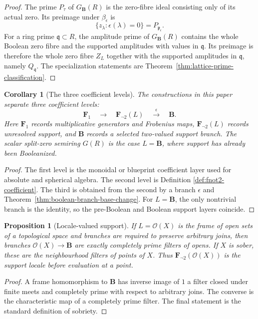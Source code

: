 \documentclass[11pt]{amsart}
\numberwithin{equation}{section}
\newtheorem{proposition}[theorem]{Proposition}
\newtheorem{corollary}[theorem]{Corollary}
\theoremstyle{definition}
\newcommand{\B}{\mathbf B}
\newcommand{\Fone}{\mathbf F_1}
\newcommand{\Fnot}{\mathbf F_{\neg 2}}
\begin{document}
\begin{proof}
The prime $P_\tau$ of $G_\B(R)$ is the zero-fibre ideal consisting only of
its actual zero.  Its preimage under $\beta_\epsilon$ is
\[
\{z_\lambda:\epsilon(\lambda)=0\}=P_{\mathfrak p_\epsilon}.
\]
For a ring prime $\mathfrak q\subset R$, the amplitude prime of
$G_\B(R)$ contains the whole Boolean zero fibre and the supported
amplitudes with values in $\mathfrak q$.  Its preimage is therefore the
whole zero fibre $Z_L$ together with the supported amplitudes in
$\mathfrak q$, namely $Q_{\mathfrak q}$.  The specialization statements are
Theorem~\ref{thm:lattice-prime-classification}.
\end{proof}

\begin{corollary}[The three coefficient levels]
\label{cor:three-coefficient-levels}
The constructions in this paper separate three coefficient levels:
\[
\boxed{
\Fone
\quad\longrightarrow\quad
\Fnot(L)
\quad\xrightarrow{\epsilon}\quad
\B.
}
\]
Here $\Fone$ records multiplicative generators and Frobenius maps,
$\Fnot(L)$ records unresolved support, and $\B$ records a selected
two-valued support branch.  The scalar split-zero semiring $G(R)$ is the
case $L=\B$, where support has already been Booleanized.
\end{corollary}

\begin{proof}
The first level is the monoidal or blueprint coefficient layer used for
absolute and spherical algebra.  The second level is Definition
\ref{def:fnot2-coefficient}.  The third is obtained from the second by a
branch $\epsilon$ and Theorem~\ref{thm:boolean-branch-base-change}.  For
$L=\B$, the only nontrivial branch is the identity, so the pre-Boolean and
Boolean support layers coincide.
\end{proof}

\begin{proposition}[Locale-valued support]
\label{prop:locale-valued-support}
If $L=\mathcal O(X)$ is the frame of open sets of a topological space and
branches are required to preserve arbitrary joins, then branches
$\mathcal O(X)\to\B$ are exactly completely prime filters of opens.  If
$X$ is sober, these are the neighbourhood filters of points of $X$.
Thus $\Fnot(\mathcal O(X))$ is the support locale before evaluation at a
point.
\end{proposition}

\begin{proof}
A frame homomorphism to $\B$ has inverse image of $1$ a filter closed under
finite meets and completely prime with respect to arbitrary joins.  The
converse is the characteristic map of a completely prime filter.  The final
statement is the standard definition of sobriety.
\end{proof}
\end{document}
